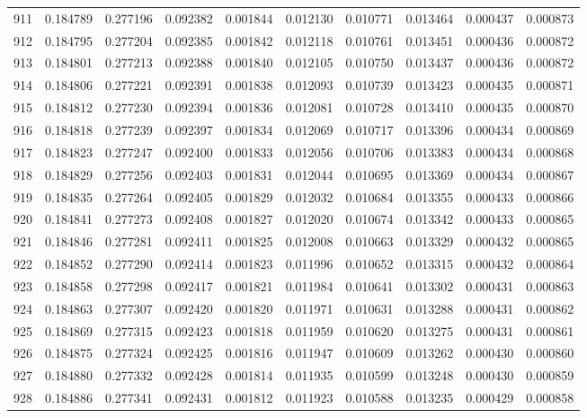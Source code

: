 \begin{tabular}{lrrrrrrrrr}
911 & 0.184789 & 0.277196 & 0.092382 & 0.001844 & 0.012130 & 0.010771 & 0.013464 & 0.000437 & 0.000873 \\
912 & 0.184795 & 0.277204 & 0.092385 & 0.001842 & 0.012118 & 0.010761 & 0.013451 & 0.000436 & 0.000872 \\
913 & 0.184801 & 0.277213 & 0.092388 & 0.001840 & 0.012105 & 0.010750 & 0.013437 & 0.000436 & 0.000872 \\
914 & 0.184806 & 0.277221 & 0.092391 & 0.001838 & 0.012093 & 0.010739 & 0.013423 & 0.000435 & 0.000871 \\
915 & 0.184812 & 0.277230 & 0.092394 & 0.001836 & 0.012081 & 0.010728 & 0.013410 & 0.000435 & 0.000870 \\
916 & 0.184818 & 0.277239 & 0.092397 & 0.001834 & 0.012069 & 0.010717 & 0.013396 & 0.000434 & 0.000869 \\
917 & 0.184823 & 0.277247 & 0.092400 & 0.001833 & 0.012056 & 0.010706 & 0.013383 & 0.000434 & 0.000868 \\
918 & 0.184829 & 0.277256 & 0.092403 & 0.001831 & 0.012044 & 0.010695 & 0.013369 & 0.000434 & 0.000867 \\
919 & 0.184835 & 0.277264 & 0.092405 & 0.001829 & 0.012032 & 0.010684 & 0.013355 & 0.000433 & 0.000866 \\
920 & 0.184841 & 0.277273 & 0.092408 & 0.001827 & 0.012020 & 0.010674 & 0.013342 & 0.000433 & 0.000865 \\
921 & 0.184846 & 0.277281 & 0.092411 & 0.001825 & 0.012008 & 0.010663 & 0.013329 & 0.000432 & 0.000865 \\
922 & 0.184852 & 0.277290 & 0.092414 & 0.001823 & 0.011996 & 0.010652 & 0.013315 & 0.000432 & 0.000864 \\
923 & 0.184858 & 0.277298 & 0.092417 & 0.001821 & 0.011984 & 0.010641 & 0.013302 & 0.000431 & 0.000863 \\
924 & 0.184863 & 0.277307 & 0.092420 & 0.001820 & 0.011971 & 0.010631 & 0.013288 & 0.000431 & 0.000862 \\
925 & 0.184869 & 0.277315 & 0.092423 & 0.001818 & 0.011959 & 0.010620 & 0.013275 & 0.000431 & 0.000861 \\
926 & 0.184875 & 0.277324 & 0.092425 & 0.001816 & 0.011947 & 0.010609 & 0.013262 & 0.000430 & 0.000860 \\
927 & 0.184880 & 0.277332 & 0.092428 & 0.001814 & 0.011935 & 0.010599 & 0.013248 & 0.000430 & 0.000859 \\
928 & 0.184886 & 0.277341 & 0.092431 & 0.001812 & 0.011923 & 0.010588 & 0.013235 & 0.000429 & 0.000858 \\

\end{tabular}
